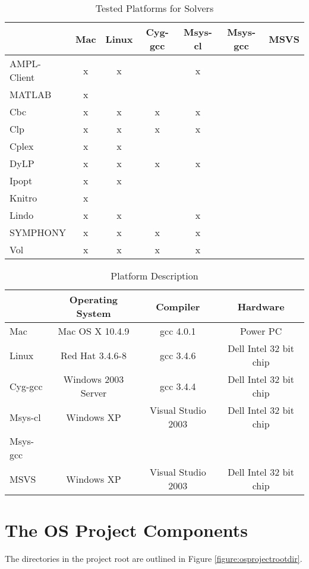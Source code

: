 \documentclass[11pt]{article}
\newcounter{Fig}
\renewcommand{\_}{{\char"5F}}
\renewcommand{\{}{{\char"7B}}
\renewcommand{\}}{{\char"7D}}
\renewcommand{\^}{{\char"0D}}
\renewcommand{\'}{{\char"0D}}
\begin{document}
\begin{table}
\caption{Tested Platforms for Solvers}
\centering
\label{table:testedplatforms}
\vskip 8pt
 \begin{tabular}{l|c|c|c|c|c|c|}
 &Mac&Linux&Cyg-gcc&Msys-cl&Msys-gcc&MSVS \\ \hline
AMPL-Client &x&x&&x&& \\ \hline
MATLAB &x&&&&& \\ \hline
Cbc &x&x&x&x&& \\ \hline
Clp &x&x&x&x&& \\ \hline
Cplex &x&x&&&& \\ \hline
DyLP &x&x&x&x&& \\ \hline
Ipopt &x&x&&&& \\ \hline
Knitro &x&&&&& \\ \hline
Lindo &x&x&&x&& \\ \hline
SYMPHONY &x&x&x&x&& \\ \hline
Vol &x&x&x&x&& \\ \hline
\end{tabular}
\end{table}
 

 \begin{table}
\caption{Platform Description}
\centering
\label{table:platformdescription}
\vskip 8pt
 \begin{tabular}{l|c|c|c|}
 & {\bf Operating System} & {\bf Compiler} & {\bf  Hardware} \\ \hline
 Mac &Mac OS X 10.4.9&gcc 4.0.1&Power PC \\   \hline
 Linux &Red Hat 3.4.6-8&gcc 3.4.6& Dell Intel 32 bit chip\\ \hline
 Cyg-gcc &Windows 2003 Server&gcc 3.4.4& Dell Intel 32 bit chip \\ \hline
 Msys-cl &Windows XP&Visual Studio 2003 &Dell Intel 32 bit chip \\ \hline
 Msys-gcc &&& \\ \hline
 MSVS &Windows XP&Visual Studio 2003 &Dell Intel 32 bit chip \\ \hline
\end{tabular}
\end{table}
 

\section{The OS Project Components}\label{section:projectcomponents}

The directories in the  project root  are outlined in Figure  \ref{figure:osprojectrootdir}.
\end{document}
